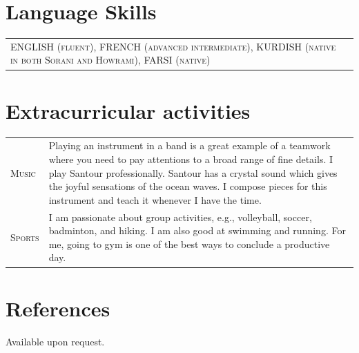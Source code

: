 \documentclass[10PT,letter]{article}
\newcommand{\numbox}[1]{} %
\begin{document}
\section*{\numbox{9}\bfseries\textcolor{titlecol}{\sffamily Language Skills}}

	\begin{tabular}{p{7.2in}p{5.55in}}
		\textsc{ENGLISH (fluent),   FRENCH (advanced intermediate),  KURDISH (native in both Sorani and Howrami), FARSI (native)} & \\[.5mm]
	\end{tabular}

\section*{\numbox{9}\bfseries\textcolor{titlecol}{\sffamily Extracurricular activities}}

	\begin{tabular}{p{1.2in}p{5.55in}}
		\textsc{Music} & Playing an instrument in a band is a great example of a teamwork where you need to pay attentions to a broad range of fine details.   I play Santour professionally. Santour has a crystal sound which gives the joyful sensations of  the ocean waves.  I compose pieces for this instrument and teach it whenever I have the time. \\[.5mm]
		\textsc{Sports} & I am passionate about group activities, e.g., volleyball, soccer, badminton, and hiking. I am also good at swimming and running. For me, going to gym is one of the best ways to conclude a productive day. \\[.5mm]
	\end{tabular}
\section*{\numbox{9}\bfseries\textcolor{titlecol}{\sffamily References}}

Available upon request. 

\end{document}
